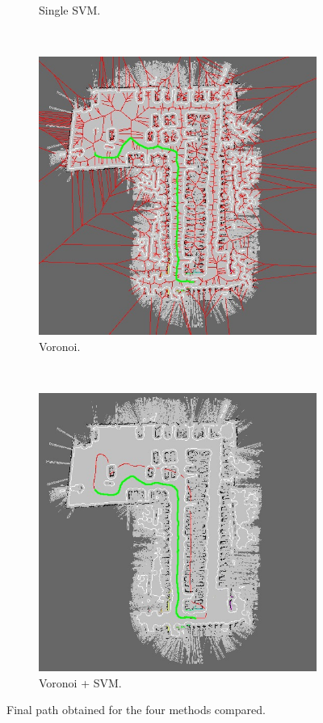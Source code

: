 \begin{figure}[h!]
\begin{subfigure}[b]{0.45\textwidth}
	  \caption{Single \ac{SVM}.}
	  \label{fig:cp06_singl_svm_final}
  \end{subfigure}
  ~
  \begin{subfigure}[b]{0.45\textwidth}
	  \centering
	  \includegraphics[width=\textwidth, trim=0 0 0 0,clip]{figure16}
	  \caption{Voronoi.}
	  \label{fig:cp06_voronoi_final}
  \end{subfigure}%
  ~
  \begin{subfigure}[b]{0.45\textwidth}
	  \centering
	  \includegraphics[width=\textwidth, trim=0 0 0 0,clip]{figure17}
	  \caption{Voronoi + \ac{SVM}.}
	  \label{fig:cp06_voronoi_svm_final}
  \end{subfigure}
  \caption{Final path obtained for the four methods compared.}\label{fig:cp06_final_path_comparison}
\end{figure}


